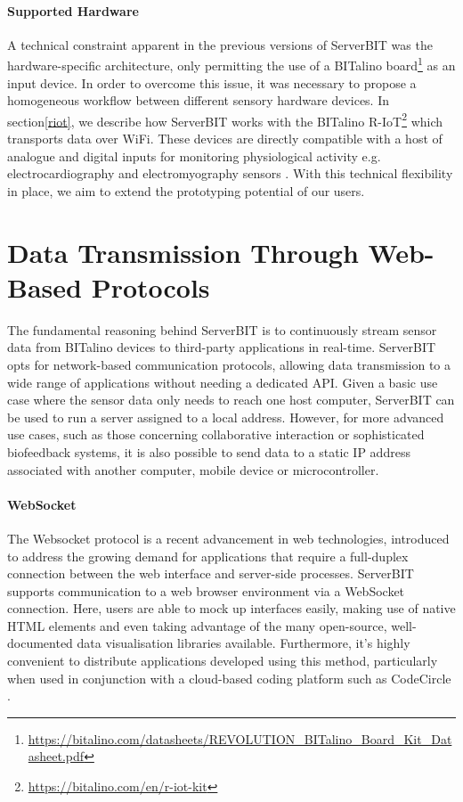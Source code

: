 \paragraph{Supported Hardware} \label{hardware}

A technical constraint apparent in the previous versions of ServerBIT was the hardware-specific architecture, only permitting the use of a BITalino board\footnote{\url{https://bitalino.com/datasheets/REVOLUTION_BITalino_Board_Kit_Datasheet.pdf}} as an input device. In order to overcome this issue, it was necessary to propose a homogeneous workflow between different sensory hardware devices. In section\ref{riot}, we describe how ServerBIT works with the BITalino R-IoT\footnote{\url{https://bitalino.com/en/r-iot-kit}} which transports data over WiFi. These devices are directly compatible with a host of analogue and digital inputs for monitoring physiological activity e.g. electrocardiography and electromyography sensors . With this technical flexibility in place, we aim to extend the prototyping potential of our users.
\newpage

\section{Data Transmission Through Web-Based Protocols}
The fundamental reasoning behind ServerBIT is to continuously stream sensor data from BITalino devices to third-party applications in real-time. ServerBIT opts for network-based communication protocols, allowing data transmission to a wide range of applications without needing a dedicated API. Given a basic use case where the sensor data only needs to reach one host computer, ServerBIT can be used to run a server assigned to a local address. However, for more advanced use cases, such as those concerning collaborative interaction or sophisticated biofeedback systems, it is also possible to send data to a static IP address associated with another computer, mobile device or microcontroller.

\paragraph{WebSocket}

The Websocket protocol is a recent advancement in web technologies\cite{lombardi_websocket:_2015}, introduced to address the growing demand for applications that require a full-duplex connection between the web interface and server-side processes. ServerBIT supports communication to a web browser environment via a WebSocket connection. Here, users are able to mock up interfaces easily, making use of native HTML elements and even taking advantage of the many open-source, well-documented data visualisation libraries available. Furthermore, it’s highly convenient to distribute applications developed using this method, particularly when used in conjunction with a cloud-based coding platform such as CodeCircle \cite{fiala_collaborative_2016}.

